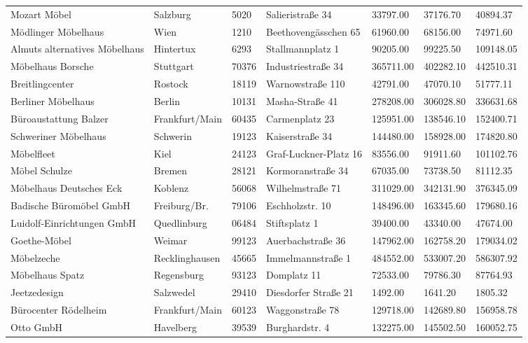 {\begin{longtable}{lllllll}
        Mozart Möbel & Salzburg & 5020 & Salieristraße 34 & 33797.00 & 37176.70 & 40894.37 \\ 
        Mödlinger Möbelhaus & Wien & 1210 & Beethovengässchen 65 & 61960.00 & 68156.00 & 74971.60 \\ 
        Almuts alternatives Möbelhaus & Hintertux & 6293 & Stallmannplatz 1 & 90205.00 & 99225.50 & 109148.05 \\ 
        Möbelhaus Borsche & Stuttgart & 70376 & Industriestraße 34 & 365711.00 & 402282.10 & 442510.31 \\ 
        Breitlingcenter & Rostock & 18119 & Warnowstraße 110 & 42791.00 & 47070.10 & 51777.11 \\ 
        Berliner Möbelhaus & Berlin & 10131 & Masha-Straße 41 & 278208.00 & 306028.80 & 336631.68 \\ 
        Büroaustattung Balzer & Frankfurt/Main & 60435 & Carmenplatz 23 & 125951.00 & 138546.10 & 152400.71 \\ 
        Schweriner Möbelhaus & Schwerin & 19123 & Kaiserstraße 34 & 144480.00 & 158928.00 & 174820.80 \\ 
        Möbelfleet & Kiel & 24123 & Graf-Luckner-Platz 16 & 83556.00 & 91911.60 & 101102.76 \\ 
        Möbel Schulze & Bremen & 28121 & Kormoranstraße 34 & 67035.00 & 73738.50 & 81112.35 \\ 
        Möbelhaus Deutsches Eck & Koblenz & 56068 & Wilhelmstraße 71 & 311029.00 & 342131.90 & 376345.09 \\ 
        Badische Büromöbel GmbH & Freiburg/Br. & 79106 & Eschholzstr. 10 & 148496.00 & 163345.60 & 179680.16 \\ 
        Luidolf-Einrichtungen GmbH & Quedlinburg & 06484 & Stiftsplatz 1 & 39400.00 & 43340.00 & 47674.00 \\ 
        Goethe-Möbel & Weimar & 99123 & Auerbachstraße 36 & 147962.00 & 162758.20 & 179034.02 \\ 
        Möbelzeche & Recklinghausen & 45665 & Immelmannstraße 1 & 484552.00 & 533007.20 & 586307.92 \\ 
        Möbelhaus Spatz & Regensburg & 93123 & Domplatz 11 & 72533.00 & 79786.30 & 87764.93 \\ 
        Jeetzedesign & Salzwedel & 29410 & Diesdorfer Straße 21 & 1492.00 & 1641.20 & 1805.32 \\ 
        Bürocenter Rödelheim & Frankfurt/Main & 60123 & Waggonstraße 78 & 129718.00 & 142689.80 & 156958.78 \\ 
        Otto GmbH & Havelberg & 39539 & Burghardstr. 4 & 132275.00 & 145502.50 & 160052.75 \\ 

\end{longtable}}
